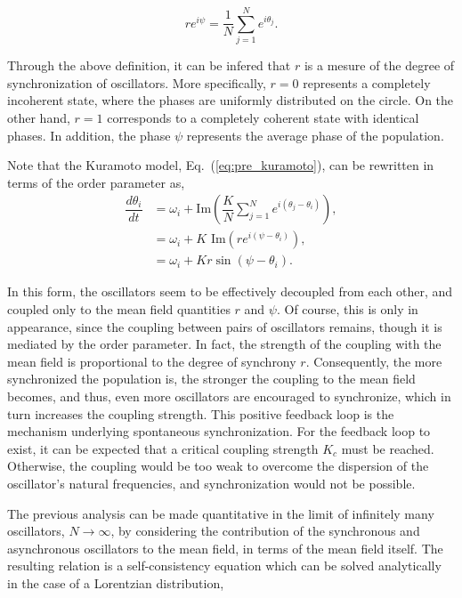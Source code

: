 \begin{equation}
    r e^{i\psi} = \dfrac{1}{N} \sum_{j=1}^{N} e^{i\theta_j}.
    \label{eq:pre_kuramoto_order}
\end{equation}

Through the above definition, it can be infered that $r$ is a mesure of the degree of synchronization
of oscillators. More specifically, $r = 0$ represents a completely incoherent state, where the phases
are uniformly distributed on the circle. On the other hand, $r = 1$ corresponds to a completely coherent 
state with identical phases. In addition, the phase $\psi$ represents the average phase of the population.


Note that the Kuramoto model, Eq.~(\ref{eq:pre_kuramoto}), can be rewritten in terms of the order 
parameter as,
\begin{align}
    \dfrac{d\theta_i}{dt} &= \omega_i 
        + \text{Im} \left(\dfrac{K}{N}\sum_{j=1}^{N} e^{i(\theta_j-\theta_i)}\right), \nonumber \\
    &= \omega_i + K \text{ Im} \left(r e^{i(\psi - \theta_i)}\right), \nonumber \\
    &= \omega_i + K r \sin(\psi - \theta_i).
    \label{eq:pre_kuramoto_mean_field}
\end{align}

In this form, the oscillators seem to be effectively decoupled from each other, and coupled only to the
mean field quantities $r$ and $\psi$. Of course, this is only in appearance, since the
coupling between pairs of oscillators remains, though it is mediated by the order parameter. In fact,
the strength of the coupling with the mean field is proportional to the degree of synchrony $r$. 
Consequently, the more synchronized the population is, the stronger the coupling to the mean field becomes, and thus,
even more oscillators are encouraged to synchronize, which in turn increases the coupling strength.
This positive feedback loop is the mechanism underlying spontaneous synchronization. For the
feedback loop to exist, it can be expected that a critical coupling strength $K_c$
must be reached. Otherwise, the coupling would be too weak to overcome the dispersion of the
oscillator's natural frequencies, and synchronization would not be possible.

The previous analysis can be made quantitative in the limit of infinitely many oscillators, $N\to\infty$,
by considering the contribution of the synchronous and
asynchronous oscillators to the mean field, in terms of the mean field itself. 
The resulting relation is a self-consistency equation which can be solved analytically
in the case of a Lorentzian distribution,


